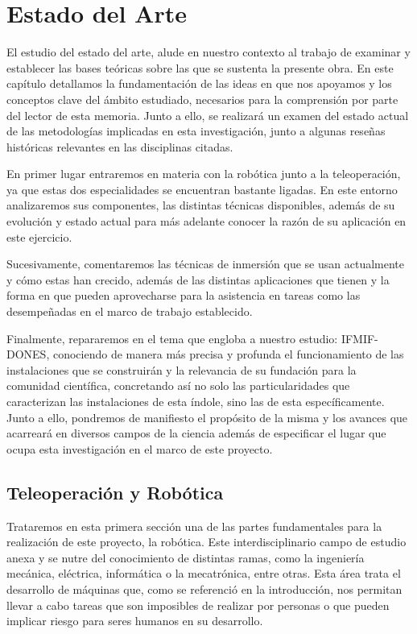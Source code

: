 \chapter{Estado del Arte}
El estudio del estado del arte, alude en nuestro contexto al trabajo de examinar  y establecer las bases teóricas sobre las que se sustenta la presente obra. En este capítulo detallamos la fundamentación de las ideas en que nos apoyamos y los conceptos clave del ámbito estudiado, necesarios para la comprensión por parte del lector de esta memoria. Junto a ello, se realizará un examen del estado actual de las metodologías implicadas en esta investigación, junto a algunas reseñas históricas relevantes en las disciplinas citadas.

En primer lugar entraremos en materia con la robótica junto a la teleoperación, ya que estas dos especialidades se encuentran bastante ligadas. En este entorno analizaremos sus componentes, las distintas técnicas disponibles, además de su evolución y estado actual para más adelante conocer la razón de su aplicación en este ejercicio.

Sucesivamente, comentaremos las técnicas de inmersión que se usan actualmente y cómo estas han crecido, además de las distintas aplicaciones que tienen y la forma en que pueden aprovecharse para la asistencia en tareas como las desempeñadas en el marco de trabajo establecido.

Finalmente, repararemos en el tema que engloba a nuestro estudio: IFMIF-DONES, conociendo de manera más precisa y profunda el funcionamiento de las instalaciones que se construirán y la relevancia de su fundación para la comunidad científica, concretando así no solo las particularidades que caracterizan las instalaciones de esta índole, sino las de esta específicamente. Junto a ello, pondremos de manifiesto el propósito de la misma y los avances que acarreará en diversos campos de la ciencia además de especificar el lugar que ocupa esta investigación en el marco de este proyecto. 

\vfill

\section{Teleoperación y Robótica}
Trataremos en esta primera sección una de las partes fundamentales para la realización de este proyecto, la robótica. Este interdisciplinario campo de estudio anexa y se nutre del  conocimiento de distintas ramas, como la ingeniería mecánica, eléctrica, informática o la mecatrónica, entre otras. Esta área trata el desarrollo de máquinas que, como se referenció en la introducción, nos permitan llevar a cabo tareas que son imposibles de realizar por personas o que pueden implicar riesgo para seres humanos en su desarrollo.

